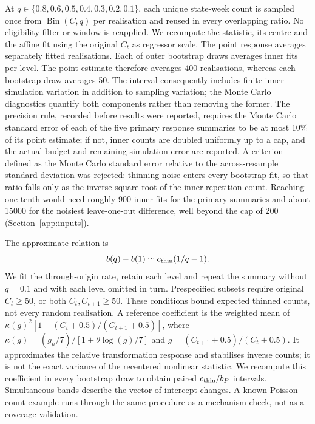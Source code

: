 At $q\in\{0.8,0.6,0.5,0.4,0.3,0.2,0.1\}$, each unique state-week count is sampled once from $\operatorname{Bin}(C,q)$ per realisation and reused in every overlapping ratio. No eligibility filter or window is reapplied. We recompute the statistic, its centre and the affine fit using the original $C_t$ as regressor scale. The point response averages \ThinPointReps{} separately fitted realisations. Each of \ThinBootstrap{} outer bootstrap draws averages \ThinInnerReps{} inner fits per level. The point estimate therefore averages 400 realisations, whereas each bootstrap draw averages 50. The interval consequently includes finite-inner simulation variation in addition to sampling variation; the Monte Carlo diagnostics quantify both components rather than removing the former. The precision rule, recorded before results were reported, requires the Monte Carlo standard error of each of the five primary response summaries to be at most 10\% of its point estimate; if not, inner counts are doubled uniformly up to a cap, and the actual budget and remaining simulation error are reported. A criterion defined as the Monte Carlo standard error relative to the across-resample standard deviation was rejected: thinning noise enters every bootstrap fit, so that ratio falls only as the inverse square root of the inner repetition count. Reaching one tenth would need roughly 900 inner fits for the primary summaries and about 15000 for the noisiest leave-one-out difference, well beyond the cap of 200 (Section~\ref{app:inputs}).

The approximate relation is
\begin{equation}
b(q)-b(1)\simeq c_{\rm thin}(1/q-1).
\label{eq:thinning}
\end{equation}
We fit the through-origin rate, retain each level and repeat the summary without $q=0.1$ and with each level omitted in turn. Prespecified subsets require original $C_t\ge50$, or both $C_t,C_{t+1}\ge50$. These conditions bound expected thinned counts, not every random realisation. A reference coefficient is the weighted mean of $\kappa(g)^2[1+(C_t+0.5)/(C_{t+1}+0.5)]$, where $\kappa(g)=(g_\mu/7)/[1+\theta\log(g)/7]$ and $g=(C_{t+1}+0.5)/(C_t+0.5)$. It approximates the relative transformation response and stabilises inverse counts; it is not the exact variance of the recentered nonlinear statistic. We recompute this coefficient in every bootstrap draw to obtain paired $c_{\rm thin}/b_P$ intervals. Simultaneous bands describe the vector of intercept changes. A known Poisson-count example runs through the same procedure as a mechanism check, not as a coverage validation.

